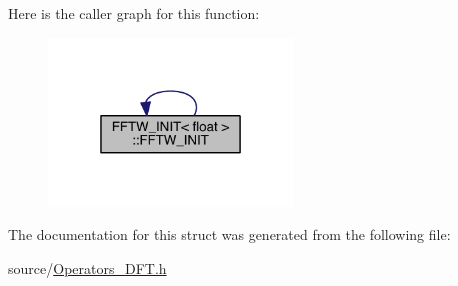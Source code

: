 Here is the caller graph for this function\+:\nopagebreak
\begin{figure}[H]
\begin{center}
\leavevmode
\includegraphics[width=184pt]{d2/de1/struct_f_f_t_w___i_n_i_t_3_01float_01_4_a95bf95941156ade33f2d8c8b7bda2e02_icgraph}
\end{center}
\end{figure}




The documentation for this struct was generated from the following file\+:\begin{DoxyCompactItemize}
\item 
source/\hyperlink{_operators___d_f_t_8h}{Operators\+\_\+\+D\+F\+T.\+h}\end{DoxyCompactItemize}
